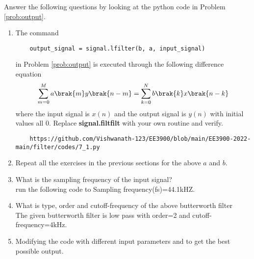 \documentclass[journal,12pt,twocolumn]{IEEEtran}
\renewcommand\thesection{\arabic{section}}
\begin{document}
Answer the following questions by looking at the python code in Problem \ref{prob:output}.
\begin{enumerate}[label=\thesection.\arabic*]
\item
The command
\begin{lstlisting}
	output_signal = signal.lfilter(b, a, input_signal)
	\end{lstlisting}
in Problem \ref{prob:output} is executed through the following difference equation
\begin{equation}
\label{eq:iir_filter_gen}
 \sum _{m=0}^{M}a\brak{m}y\brak{n-m}=\sum _{k=0}^{N}b\brak{k}x\brak{n-k}
\end{equation}
%
where the input signal is $x(n)$ and the output signal is $y(n)$ with initial values all 0. Replace
\textbf{signal.filtfilt} with your own routine and verify.
%
\solution 
\begin{lstlisting}
    https://github.com/Vishwanath-123/EE3900/blob/main/EE3900-2022-main/filter/codes/7_1.py
\end{lstlisting}
\item Repeat all the exercises in the previous sections for the above $a$ and $b$.

\item What is the sampling frequency of the input signal?
\\
\solution run the following code to 
Sampling frequency(fs)=44.1kHZ.
\item
What is type, order and  cutoff-frequency of the above butterworth filter
\\
\solution
The given butterworth filter is low pass with order=2 and cutoff-frequency=4kHz.
%
\item
Modifying the code with different input parameters and to get the best possible output.
%
\end{enumerate}
\end{document}
